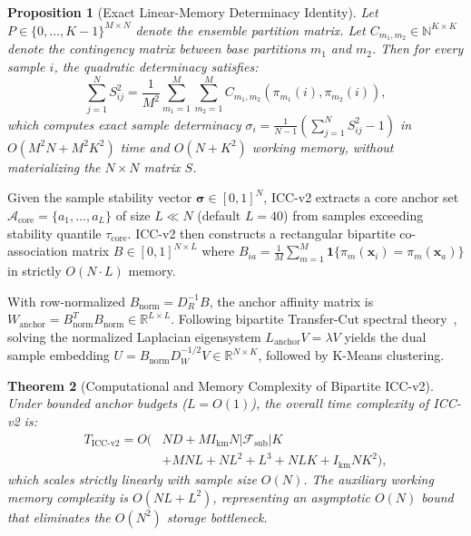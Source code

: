 \documentclass[10pt,conference]{IEEEtran}
\newtheorem{theorem}{Theorem}
\newtheorem{proposition}[theorem]{Proposition}
\begin{document}
\begin{proposition}[Exact Linear-Memory Determinacy Identity]\label{prop:linear_determinacy}
Let $P \in \{0, \dots, K-1\}^{M \times N}$ denote the ensemble partition matrix. Let $C_{m_1, m_2} \in \mathbb{N}^{K \times K}$ denote the contingency matrix between base partitions $m_1$ and $m_2$. Then for every sample $i$, the quadratic determinacy satisfies:
\begin{equation}
    \sum_{j=1}^N S_{ij}^2 = \frac{1}{M^2} \sum_{m_1=1}^M \sum_{m_2=1}^M C_{m_1, m_2}(\pi_{m_1}(i), \pi_{m_2}(i)),
\end{equation}
which computes exact sample determinacy $\sigma_i = \frac{1}{N-1}\left(\sum_{j=1}^N S_{ij}^2 - 1\right)$ in $O(M^2 N + M^2 K^2)$ time and $O(N + K^2)$ working memory, without materializing the $N \times N$ matrix $S$.
\end{proposition}

Given the sample stability vector $\boldsymbol{\sigma} \in [0, 1]^N$, ICC-v2 extracts a core anchor set $\mathcal{A}_{\text{core}} = \{a_1, \dots, a_L\}$ of size $L \ll N$ (default $L=40$) from samples exceeding stability quantile $\tau_{\text{core}}$. ICC-v2 then constructs a rectangular bipartite co-association matrix $B \in [0, 1]^{N \times L}$ where $B_{ia} = \frac{1}{M}\sum_{m=1}^M \mathbf{1}\{\pi_m(\mathbf{x}_i) = \pi_m(\mathbf{x}_a)\}$ in strictly $O(N \cdot L)$ memory.

With row-normalized $B_{\text{norm}} = D_R^{-1} B$, the anchor affinity matrix is $W_{\text{anchor}} = B_{\text{norm}}^T B_{\text{norm}} \in \mathbb{R}^{L \times L}$. Following bipartite Transfer-Cut spectral theory~\cite{li2015transfer,nie2024fast}, solving the normalized Laplacian eigensystem $L_{\text{anchor}} V = \lambda V$ yields the dual sample embedding $U = B_{\text{norm}} D_W^{-1/2} V \in \mathbb{R}^{N \times K}$, followed by K-Means clustering.

\begin{theorem}[Computational and Memory Complexity of Bipartite ICC-v2]
Under bounded anchor budgets ($L = O(1)$), the overall time complexity of ICC-v2 is:
\begin{equation}
\begin{split}
    T_{\text{ICC-v2}} = O\bigl(&N D + M I_{\text{km}} N |\mathcal{F}_{\text{sub}}| K\\
    &+ M N L + N L^2 + L^3 + N L K + I_{\text{km}} N K^2\bigr),
\end{split}
\end{equation}
which scales strictly linearly with sample size $O(N)$. The auxiliary working memory complexity is $O(N L + L^2)$, representing an asymptotic $O(N)$ bound that eliminates the $O(N^2)$ storage bottleneck.
\end{theorem}
\end{document}
